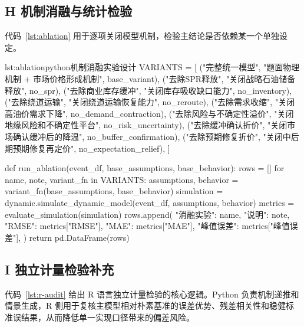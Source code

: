 \clearpage

\subsection*{H 机制消融与统计检验}

代码~\ref{lst:ablation} 用于逐项关闭模型机制，检验主结论是否依赖某一个单独设定。

\begin{paperlisting}{lst:ablation}{python}{机制消融实验设计}
VARIANTS = [
    ("完整统一模型", "题面物理机制 + 市场价格形成机制", base_variant),
    ("去除SPR释放", "关闭战略石油储备释放", no_spr),
    ("去除商业库存缓冲", "关闭库存吸收缺口能力", no_inventory),
    ("去除绕道运输", "关闭绕道运输恢复能力", no_reroute),
    ("去除需求收缩", "关闭高油价需求下降", no_demand_contraction),
    ("去除风险与不确定性溢价", "关闭地缘风险和不确定性平台", no_risk_uncertainty),
    ("去除缓冲确认折价", "关闭市场确认缓冲后的降温", no_buffer_confirmation),
    ("去除预期修复折价", "关闭中后期预期修复再定价", no_expectation_relief),
]

def run_ablation(event_df, base_assumptions, base_behavior):
    rows = []
    for name, note, variant_fn in VARIANTS:
        assumptions, behavior = variant_fn(base_assumptions, base_behavior)
        simulation = dynamic.simulate_dynamic_model(event_df, assumptions, behavior)
        metrics = evaluate_simulation(simulation)
        rows.append({
            "消融实验": name,
            "说明": note,
            "RMSE": metrics["RMSE"],
            "MAE": metrics["MAE"],
            "峰值误差": metrics["峰值误差"],
        })
    return pd.DataFrame(rows)
\end{paperlisting}

\clearpage

\subsection*{I 独立计量检验补充}

代码~\ref{lst:r-audit} 给出 R 语言独立计量检验的核心逻辑。Python 负责机制递推和情景生成，R 侧用于复核主模型相对朴素基准的误差优势、残差相关性和稳健标准误结果，从而降低单一实现口径带来的偏差风险。

